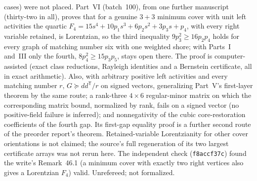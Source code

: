 \documentclass[11pt]{article}
\begin{document}
{cases) were not placed.  Part~VI (batch~100), from one further manuscript
(thirty-two in all), proves that for a genuine $3+3$ minimum cover with unit
left activities the quartic $F_4=15s^4+10p_1s^3+6p_2s^2+3p_3s+p_4$, with
every right variable retained, is Lorentzian, so the third inequality
$9p_3^2\ge16p_2p_4$ holds for every graph of matching number six with one
weighted shore; with Parts~I and~III only the fourth, $8p_4^2\ge15p_3p_5$,
stays open there.  The proof is computer-assisted (exact class reductions,
Rayleigh identities and a Bernstein certificate, all in exact arithmetic).
Also, with arbitrary positive left activities and every matching number $r$,
$G\succeq dd^{\mathsf T}/r$ on signed vectors, generalizing Part~V's
first-layer theorem by the same route; a rank-three $4\times6$ regular-minor
matrix on which the corresponding matrix bound, normalized by rank, fails on
a signed vector (no positive-field failure is inferred); and nonnegativity of
the cubic core-restoration coefficients of the fourth gap.  Its first-gap
equality proof is a further second route of the preorder report's theorem.
Retained-variable Lorentzianity for other cover orientations is not claimed;
the source's full regeneration of its two largest certificate arrays was not
rerun here.  The independent check (\texttt{f8accf37c}) found the write's
Remark~46.1 (a minimum cover with exactly two right vertices also gives a
Lorentzian $F_4$) valid.  Unrefereed; not formalized.}
\end{document}
